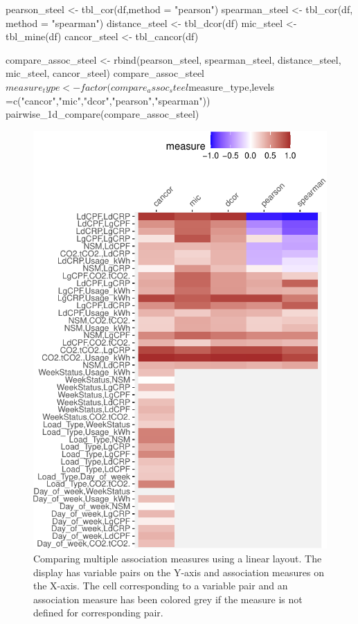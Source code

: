\begin{Schunk}
\begin{Sinput}
pearson_steel <- tbl_cor(df,method = "pearson")
spearman_steel <- tbl_cor(df, method = "spearman")
distance_steel <- tbl_dcor(df)
mic_steel <- tbl_mine(df)
cancor_steel <- tbl_cancor(df)

compare_assoc_steel <- rbind(pearson_steel, spearman_steel, distance_steel, mic_steel, cancor_steel)
compare_assoc_steel$measure_type <- factor(compare_assoc_steel$measure_type,levels =c("cancor","mic","dcor","pearson","spearman"))
pairwise_1d_compare(compare_assoc_steel)
\end{Sinput}
\begin{figure}

{\centering \includegraphics{rj_paper_files/figure-latex/compare-linear-1} 

}

\caption[Comparing multiple association measures using a linear layout]{Comparing multiple association measures using a linear layout. The display has variable pairs on the Y-axis and association measures on the X-axis. The cell corresponding to a variable pair and an association measure has been colored grey if the measure is not defined for corresponding pair.}\label{fig:compare-linear}
\end{figure}
\end{Schunk}

